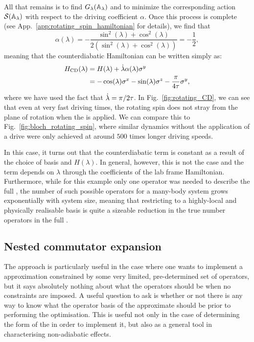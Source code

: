     All that remains is to find $G_{\lambda}(\mathbb{A}_{\lambda})$ and to minimize the corresponding action $\mathcal{S}(\mathbb{A}_{\lambda})$ with respect to the driving coefficient $\alpha$. Once this process is complete (see App.~\ref{app:rotating_spin_hamiltonian} for details), we find that
    \begin{equation}\label{eq:rotating_spin_alpha}
        \alpha(\lambda) = -\frac{\sin^2(\lambda) + \cos^2(\lambda)}{2(\sin^2(\lambda) + \cos^2(\lambda))} = - \frac{1}{2},
    \end{equation}
    meaning that the counterdiabatic Hamiltonian can be written simply as:
    \begin{equation}\label{eq:rotating_spin_HCD}
        \begin{aligned}
            H_{\rm CD}(\lambda) &= H(\lambda) + \dot{\lambda} \alpha(\lambda) \sigma^y \\
            &= -\cos(\lambda)\sigma^x - \sin(\lambda)\sigma^z - \frac{\pi}{4 \tau} \sigma^y,
        \end{aligned}
    \end{equation}
    where we have used the fact that $\dot{\lambda} = \pi/2\tau$. In Fig.~\ref{fig:rotating_CD}, we can see that even at very fast driving times, the rotating spin does not stray from the plane of rotation when the  is applied. We can compare this to Fig.~\ref{fig:bloch_rotating_spin}, where similar dynamics without the application of a  drive were only achieved at around $500$ times longer driving speeds.
    
    In this case, it turns out that the counterdiabatic term is constant as a result of the choice of basis and $H(\lambda)$. In general, however, this is not the case and the  term depends on $\lambda$ through the coefficients of the lab frame Hamiltonian. Furthermore, while for this example only one operator was needed to describe the full , the number of such possible operators for a many-body system grows exponentially with system size, meaning that restricting to a highly-local and physically realisable basis is quite a sizeable reduction in the true number operators in the full .
    
    \subsection{Nested commutator expansion}\label{sec:2.4.2_nested_commutators}

    The  approach is particularly useful in the case where one wants to implement a  approximation constrained by some very limited, pre-determined set of operators, but it says absolutely nothing about what the operators should be when no constraints are imposed. A useful question to ask is whether or not there is any way to know what the operator basis of the approximate  should be prior to performing the optimisation. This is useful not only in the case of determining the form of the  in order to implement it, but also as a general tool in characterising non-adiabatic effects.

